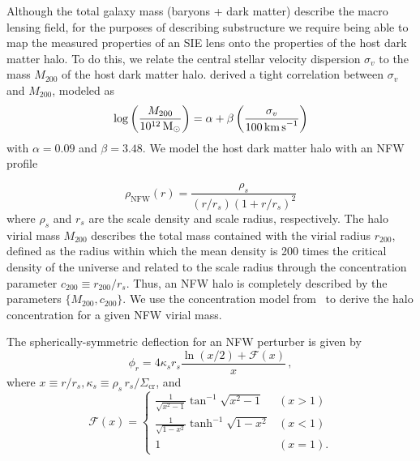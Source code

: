 \documentclass[twocolumn]{aastex63}
\begin{document}
Although the total galaxy mass (baryons + dark matter) describe the macro lensing field, for the purposes of describing substructure we require being able to map the measured properties of an SIE lens onto the properties of the host dark matter halo. To do this, we relate the central stellar velocity dispersion $\sigma_v$ to the mass $M_{200}$ of the host dark matter halo. \citet{2018ApJ...859...96Z} derived a tight correlation between $\sigma_v$ and $M_{200}$, modeled as
\begin{equation}
\log\left(\frac{M_{200}}{10^{12}\,\Msun}\right) = \alpha + \beta\left(\frac{\sigma_v}{100\,\kmps}\right)
\label{eq:sigma_v_M_200_relation}
\end{equation}
with $\alpha = 0.09$ and $\beta = 3.48$. 
We model the host dark matter halo with an NFW profile~\citep{1996ApJ...462..563N,1997ApJ...490..493N}

\begin{equation}
\rho_\mathrm{NFW}(r)=\frac{\rho_{s}}{\left(r / r_{s}\right)\left(1+r / r_{s}\right)^{2}}
\label{eq:rhoNFW}
\end{equation}
where $\rho_s$ and $r_s$ are the scale density and scale radius, respectively. The halo virial mass $M_{200}$ describes the total mass contained with the virial radius $r_{200}$, defined as the radius within which the mean density is 200 times the critical density of the universe and related to the scale radius through the concentration parameter $c_{200} \equiv r_{200}/r_s$. Thus, an NFW halo is completely described by the parameters $\{M_{200}, c_{200}\}$. We use the concentration model from~\citet{2014MNRAS.442.2271S} to derive the halo concentration for a given NFW virial mass.

The spherically-symmetric deflection for an NFW perturber is given by~\citep{2001astro.ph..2341K}
\begin{equation}
\phi_{r}=4 \kappa_{s} r_{s} \frac{\ln (x / 2)+\mathcal{F}(x)}{x} \,,
\label{eq:nfw_deflection}
\end{equation}
where $x \equiv r/r_s, \kappa_s\equiv \rho_s\,r_s/\Sigma_\mathrm{cr}$, and
\begin{equation}
\mathcal{F}(x)=\left\{\begin{array}{ll}{\frac{1}{\sqrt{x^{2}-1}} \tan ^{-1} \sqrt{x^{2}-1}} & {(x>1)} \\ {\frac{1}{\sqrt{1-x^{2}}} \tanh ^{-1} \sqrt{1-x^{2}}} & {(x<1)} \\ {1} & {(x=1).}\end{array}\right.
\label{eq:Fx}
\end{equation}
\end{document}
